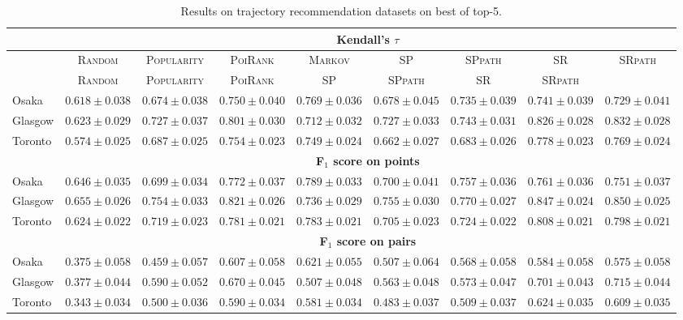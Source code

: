 \begin{table*}[!h]
\centering
\scriptsize
\setlength{\tabcolsep}{3pt} %
\begin{tabular}{l|cc|ccc|ccc} \hline
& \multicolumn{8}{c}{\bf Kendall's $\tau$} \\ \hline
 & \textsc{Random} & \textsc{Popularity} & \textsc{PoiRank} & \textsc{Markov} & \textsc{SP} & \textsc{SPpath} & \textsc{SR} & \textsc{SRpath} \\ \hline
 & \textsc{Random} & \textsc{Popularity} & \textsc{PoiRank} & \textsc{SP} & \textsc{SPpath} & \textsc{SR} & \textsc{SRpath} \\ \hline
Osaka & $0.618\pm0.038$ & $0.674\pm0.038$ & $\mathit{0.750\pm0.040}$ & $\mathbf{0.769\pm0.036}$ & $0.678\pm0.045$ & $0.735\pm0.039$ & $0.741\pm0.039$ & $0.729\pm0.041$ \\
Glasgow & $0.623\pm0.029$ & $0.727\pm0.037$ & $0.801\pm0.030$ & $0.712\pm0.032$ & $0.727\pm0.033$ & $0.743\pm0.031$ & $\mathit{0.826\pm0.028}$ & $\mathbf{0.832\pm0.028}$ \\
Toronto & $0.574\pm0.025$ & $0.687\pm0.025$ & $0.754\pm0.023$ & $0.749\pm0.024$ & $0.662\pm0.027$ & $0.683\pm0.026$ & $\mathbf{0.778\pm0.023}$ & $\mathit{0.769\pm0.024}$ \\
\hline
& \multicolumn{8}{c}{\bf F$_1$ score on points} \\ \hline
Osaka & $0.646\pm0.035$ & $0.699\pm0.034$ & $\mathit{0.772\pm0.037}$ & $\mathbf{0.789\pm0.033}$ & $0.700\pm0.041$ & $0.757\pm0.036$ & $0.761\pm0.036$ & $0.751\pm0.037$ \\
Glasgow & $0.655\pm0.026$ & $0.754\pm0.033$ & $0.821\pm0.026$ & $0.736\pm0.029$ & $0.755\pm0.030$ & $0.770\pm0.027$ & $\mathit{0.847\pm0.024}$ & $\mathbf{0.850\pm0.025}$ \\
Toronto & $0.624\pm0.022$ & $0.719\pm0.023$ & $0.781\pm0.021$ & $0.783\pm0.021$ & $0.705\pm0.023$ & $0.724\pm0.022$ & $\mathbf{0.808\pm0.021}$ & $\mathit{0.798\pm0.021}$ \\
\hline
& \multicolumn{8}{c}{\bf F$_1$ score on pairs} \\ \hline
Osaka & $0.375\pm0.058$ & $0.459\pm0.057$ & $\mathit{0.607\pm0.058}$ & $\mathbf{0.621\pm0.055}$ & $0.507\pm0.064$ & $0.568\pm0.058$ & $0.584\pm0.058$ & $0.575\pm0.058$ \\
Glasgow & $0.377\pm0.044$ & $0.590\pm0.052$ & $0.670\pm0.045$ & $0.507\pm0.048$ & $0.563\pm0.048$ & $0.573\pm0.047$ & $\mathit{0.701\pm0.043}$ & $\mathbf{0.715\pm0.044}$ \\
Toronto & $0.343\pm0.034$ & $0.500\pm0.036$ & $0.590\pm0.034$ & $0.581\pm0.034$ & $0.483\pm0.037$ & $0.509\pm0.037$ & $\mathbf{0.624\pm0.035}$ & $\mathit{0.609\pm0.035}$ \\
\hline
\end{tabular}
\caption{Results on trajectory recommendation datasets on best of top-5.}
\end{table*}


